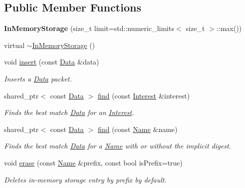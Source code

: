 \subsection*{Public Member Functions}
\begin{DoxyCompactItemize}
\item 
{\bfseries In\+Memory\+Storage} (size\+\_\+t limit=std\+::numeric\+\_\+limits$<$ size\+\_\+t $>$\+::max())\hypertarget{classndn_1_1util_1_1InMemoryStorage_a292fecc43914aec6dda00563b6729497}{}\label{classndn_1_1util_1_1InMemoryStorage_a292fecc43914aec6dda00563b6729497}

\item 
virtual \hyperlink{classndn_1_1util_1_1InMemoryStorage_a7cffc8feac46fec7daec31d27eec1f2e}{$\sim$\+In\+Memory\+Storage} ()
\item 
void \hyperlink{classndn_1_1util_1_1InMemoryStorage_aaa980f4b6304380b7f435e44fd6d1b2a}{insert} (const \hyperlink{classndn_1_1Data}{Data} \&data)
\begin{DoxyCompactList}\small\item\em Inserts a \hyperlink{classndn_1_1Data}{Data} packet. \end{DoxyCompactList}\item 
shared\+\_\+ptr$<$ const \hyperlink{classndn_1_1Data}{Data} $>$ \hyperlink{classndn_1_1util_1_1InMemoryStorage_a01ee745af540a1d99b5a18c5722d50c5}{find} (const \hyperlink{classndn_1_1Interest}{Interest} \&interest)
\begin{DoxyCompactList}\small\item\em Finds the best match \hyperlink{classndn_1_1Data}{Data} for an \hyperlink{classndn_1_1Interest}{Interest}. \end{DoxyCompactList}\item 
shared\+\_\+ptr$<$ const \hyperlink{classndn_1_1Data}{Data} $>$ \hyperlink{classndn_1_1util_1_1InMemoryStorage_ac57e4ccfc43c7fdb6c7baf4c32219b94}{find} (const \hyperlink{classndn_1_1Name}{Name} \&name)
\begin{DoxyCompactList}\small\item\em Finds the best match \hyperlink{classndn_1_1Data}{Data} for a \hyperlink{classndn_1_1Name}{Name} with or without the implicit digest. \end{DoxyCompactList}\item 
void \hyperlink{classndn_1_1util_1_1InMemoryStorage_a3ada8f942e99805451513369d497c82f}{erase} (const \hyperlink{classndn_1_1Name}{Name} \&prefix, const bool is\+Prefix=true)
\begin{DoxyCompactList}\small\item\em Deletes in-\/memory storage entry by prefix by default. \end{DoxyCompactList}\item 

\end{DoxyCompactItemize}
